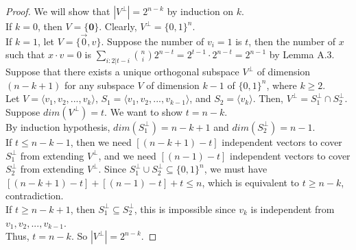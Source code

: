 \begin{proof}
We will show that $|V^\perp| = 2^{n-k}$ by induction on $k$.\\
If $k=0$, then $V = \{ \textbf{0}\}$. Clearly, $V^\perp = \{ 0, 1 \}^n$. \\
If $k=1$, let $V = \{ \vec{0}, v \}$. 
Suppose the number of $v_i = 1$ is $t$, 
then the number of $x$ such that $x \cdot v = 0$ is 
$\sum \limits_{i: 2|t-i} {n \choose i} 2^{n-t} =
2^{t-1} \cdot 2^{n-t} = 2^{n-1}$ by Lemma A.3. \\
Suppose that there exists a unique orthogonal subspace $V^\perp$ 
of dimension $(n-k+1)$ for any subspace $V$ of dimension $k-1$ of $\{ 0,1 \}^n$, where $k \geq 2$. \\
Let $V=\langle v_1, v_2,..., v_{k} \rangle$, 
$S_1 = \langle v_1, v_2,..., v_{k-1}\rangle$, 
and $S_2 = \langle v_{k}\rangle$.  Then, $V^\perp = S_1^\perp \cap S_2^\perp$. \\
Suppose $dim(V^\perp) = t$. We want to show $t = n-k$.\\
By induction hypothesis, $dim(S_1^\perp) = n-k+1$ 
and $dim(S_2^\perp) = n-1$. \\
If $t \leq n-k-1$, then we need $[(n-k+1) - t]$ independent vectors to cover $S_1^\perp$ from extending $V^\perp$, and we need $[(n-1) -t]$ independent vectors to cover $S_2^\perp$ from extending $V^\perp$. Since $S_1^\perp \cup S_2^\perp \subseteq \{ 0,1\}^n$, we must have $[(n-k+1) - t] + [(n-1) -t] + t \leq n$, which is equivalent to $t \geq n-k$, contradiction.\\
If $t \geq n-k+1$, then $S_1^\perp \subseteq S_2^\perp$,
this is impossible since $v_k$ is independent from $v_1, v_2, ..., v_{k-1}$. \\
Thus, $t = n-k$. So $|V^\perp| = 2^{n-k}$. 
\end{proof}

